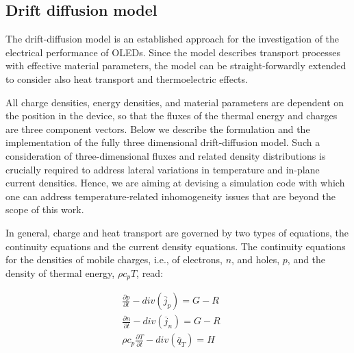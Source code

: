 \documentclass[%
9pt,
 aip,
rsi,%
 amsmath,amssymb,
preprint,%
]{revtex4-1}
\begin{document}
\subsection{Drift diffusion model} 
The drift-diffusion model is an established approach for the investigation of the electrical performance of OLEDs.\cite{Davids1998,Knapp2010,Knapp2011,Ruhstaller2003,Slawinski2011,VanMensfoort2008} 
Since the model describes transport processes with effective material parameters, the model can be straight-forwardly extended to consider also heat transport and thermoelectric effects.\cite{Park2011a}

All charge densities, energy densities, and material parameters are dependent on the position in the device, %
so that the fluxes of the thermal energy and charges are three component vectors.
Below we describe the formulation and the implementation of the fully three dimensional drift-diffusion model.
Such a consideration of three-dimensional fluxes and related density distributions is crucially required to address lateral variations in temperature and in-plane current densities. 
Hence, we are aiming at devising a simulation code with which one can address temperature-related inhomogeneity issues that are beyond the scope of this work. 

In general, charge and heat transport are governed by two types of equations, the continuity equations and the current density equations.
The continuity equations for the densities of mobile charges, i.e., of electrons, $n$, and holes, $p$, and the density of thermal energy, $\rho c_p T$, read:

\begin{subequations}
	\begin{gather}
		\frac{\partial p}{\partial t} - div\left( \overline{j}_p\right) =G-R\label{eq:contp}\\	
		\frac{\partial n}{\partial t} - div\left( \overline{j}_n\right)=G-R\label{eq:contn}\\
		\rho c_p \frac{\partial T}{\partial t}-div\left(\overline{q}_T\right)=H\label{eq:contT}\qquad 
	\end{gather}
    \label{eq:cont}
\end{subequations}
\end{document}
